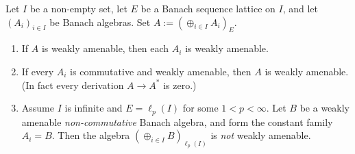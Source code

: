 \documentclass[10pt,a4paper]{amsart}
\begin{document}
\begin{theorem}\label{thm:WA-counterpart}
Let $I$ be a non-empty set, let $E$ be a Banach sequence lattice on $I$, and let $(A_i)_{i\in I}$ be Banach algebras.
Set $A:=(\oplus_{i\in I}A_i)_E$.

\begin{enumerate}[label={\rm(\arabic*)},leftmargin=3.2em]
\item If $A$ is weakly amenable, then each $A_i$ is weakly amenable.
\item If every $A_i$ is commutative and weakly amenable, then $A$ is weakly amenable.
(In fact every derivation $A\to A^*$ is zero.)
\item Assume $I$ is infinite and $E=\ell_p(I)$ for some $1<p<\infty$.
Let $B$ be a weakly amenable \emph{non-commutative} Banach algebra, and form the constant family $A_i=B$.
Then the algebra $(\oplus_{i\in I}B)_{\ell_p(I)}$ is \emph{not} weakly amenable.
\end{enumerate}
\end{theorem}
\end{document}
